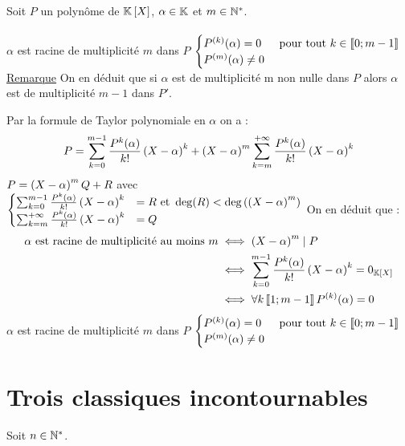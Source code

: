 \begin{defprop}
    Soit \(P\) un polynôme de \(\mathbb{K} \left[X\right]\), \(\alpha \in \mathbb{K}\) et \(m \in \mathbb{N}^*\).\\~\\
    \(\alpha\) est racine de multiplicité \(m\) dans \(P\) \ssi \(\begin{cases}
        P^{(k)}(\alpha) = 0 &\text{ pour tout } k \in \left\llbracket0;m-1\right\rrbracket\\
        P^{(m)}(\alpha) \neq 0
    \end{cases}\)
    \underline{Remarque}
    On en déduit que si \(\alpha\) est de multiplicité m non nulle dans \(P\) alors \(\alpha\) est de multiplicité \(m - 1\) dans \(P '\).
\end{defprop}

\begin{dem}
    Par la formule de Taylor polynomiale en \(\alpha\) on a  : \[P  = \sum_{k=0}^{m-1} \frac{P ^{k}(\alpha)}{k!}\left(X- \alpha\right)^k + \left(X-\alpha\right)^m \sum_{k=m}^{+\infty} \frac{P ^{k}(\alpha)}{k!}\left(X- \alpha\right)^k\] 
    \ie \(P = \left(X-\alpha\right)^mQ + R \)  avec \(\begin{cases}
        \sum_{k=0}^{m-1} \frac{P ^{k}(\alpha)}{k!}\left(X- \alpha\right)^k &= R \text{ et } \deg(R) < \deg\left( \left(X-\alpha\right)^m\right)\\
        \sum_{k=m}^{+\infty} \frac{P ^{k}(\alpha)}{k!}\left(X- \alpha\right)^k & = Q
    \end{cases}\)
    On en déduit que  : \begin{align*}
        \alpha \text{ est racine de multiplicité au moins } m &\iff \left(X-\alpha\right)^m \mid P \\
        &\iff \sum_{k=0}^{m-1} \frac{P ^{k}(\alpha)}{k!}\left(X- \alpha\right)^k = 0_{\mathbb{K} \left[X\right]} \\
        &\iff \forall k \left\llbracket1;m-1\right\rrbracket P ^{(k)}(\alpha) = 0
    \end{align*}
    \conclusion \(\alpha\) est racine de multiplicité \(m\) dans \(P\) \ssi \(\begin{cases}
        P^{(k)}(\alpha) = 0 &\text{ pour tout } k \in \left\llbracket0;m-1\right\rrbracket\\
        P^{(m)}(\alpha) \neq 0
    \end{cases}\)
\end{dem}

\section{Trois classiques incontournables}
Soit \(n \in \mathbb{N}^*\).
